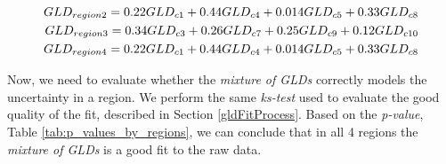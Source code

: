 \documentclass[11pt]{article}
\begin{document}
\begin{table}[!ht]
\begin{center}
    \caption {Distribution of the clusters by regions. The four regions are selected intentionally this way to warrant different distributions of the clusters inside it.}
    \label{tab:distribution_of_the_clusters_by_regions}
    \end{center}
\end{table}


\begin{align}
\vspace{-0.2cm}
\begin{split}
\label{eq:gld_mix}
GLD_{region2} = 0.22GLD_{c1} + 0.44GLD_{c4} + 0.014GLD_{c5} + 0.33GLD_{c8} \\
 GLD_{region3} = 0.34GLD_{c3} + 0.26GLD_{c7} + 0.25GLD_{c9} + 0.12GLD_{c10} \\
 GLD_{region4} = 0.22GLD_{c1} + 0.44GLD_{c4} + 0.014GLD_{c5}  + 0.33GLD_{c8}
\end{split}
\end{align}


Now, we need to evaluate whether the \textit{mixture of GLDs} correctly models the uncertainty in a region. We perform the same \textit{ks-test} used to evaluate the
good quality of the fit, described in Section \ref{gldFitProcess}. Based on the \textit{p-value}, Table \ref{tab:p_values_by_regions}, we can conclude that in all 4 regions the \textit{mixture of GLDs} is a good fit to the raw data.
\end{document}
